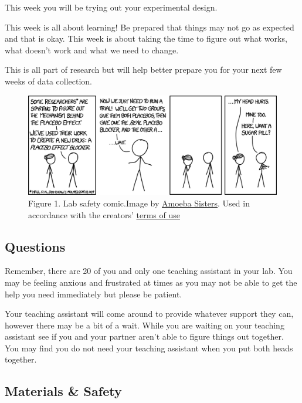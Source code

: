 \documentclass[
]{book}
\begin{document}
This week you will be trying out your experimental design.

This week is all about learning! Be prepared that things may not go as expected and that is okay. This week is about taking the time to figure out what works, what doesn't work and what we need to change.

This is all part of research but will help better prepare you for your next few weeks of data collection.

\begin{figure}
\centering
\includegraphics{figures_images/Lab4-Fig1.png}
\caption{Figure 1. Lab safety comic.Image by \href{Lab4-Fig1.png}{Amoeba Sisters}. Used in accordance with the creators' \href{https://www.amoebasisters.com/termsofuse.html}{terms of use}}
\end{figure}

\hypertarget{questions}{%
\subsection*{Questions}\label{questions}}

Remember, there are 20 of you and only one teaching assistant in your lab. You may be feeling anxious and frustrated at times as you may not be able to get the help you need immediately but please be patient.

Your teaching assistant will come around to provide whatever support they can, however there may be a bit of a wait. While you are waiting on your teaching assistant see if you and your partner aren't able to figure things out together. You may find you do not need your teaching assistant when you put both heads together.

\hypertarget{materials-safety}{%
\subsection*{Materials \& Safety}\label{materials-safety}}
\end{document}
